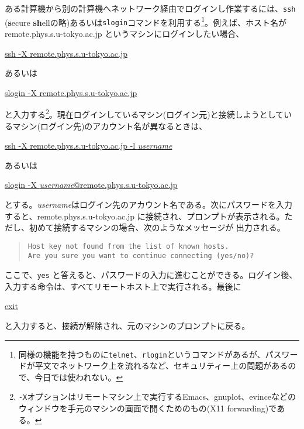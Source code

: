 ある計算機から別の計算機へネットワーク経由でログインし作業するには、{\tt ssh} ({\bf s}ecure {\bf sh}ellの略)あるいは{\tt slogin}コマンドを利用する\footnote{同様の機能を持つものに{\tt telnet}、{\tt rlogin}というコマンドがあるが、パスワードが平文でネットワーク上を流れるなど、セキュリティー上の問題があるので、今日では使われない。}。例えば、ホスト名が remote.phys.s.u-tokyo.ac.jp というマシンにログインしたい場合、
\begin{commandline2}
\prompt \underline{ssh -X remote.phys.s.u-tokyo.ac.jp}
\end{commandline2} \noindent
あるいは
\begin{commandline2}
\prompt \underline{slogin -X remote.phys.s.u-tokyo.ac.jp}
\end{commandline2} \noindent
と入力する\footnote{{\tt -X}オプションはリモートマシン上で実行するEmacs、gnuplot、evinceなどのウィンドウを手元のマシンの画面で開くためのもの(X11 forwarding)である。}。現在ログインしているマシン(ログイン元)と接続しようとしているマシン(ログイン先)のアカウント名が異なるときは、
\begin{commandline2}
\prompt \underline{ssh -X remote.phys.s.u-tokyo.ac.jp -l {\it username}}
\end{commandline2} \noindent
あるいは
\begin{commandline2}
\prompt \underline{slogin -X {\it username}@remote.phys.s.u-tokyo.ac.jp}
\end{commandline2} \noindent
とする。{\it username}はログイン先のアカウント名である。次にパスワードを入力すると、remote.phys.s.u-tokyo.ac.jp に接続され、プロンプトが表示される。ただし、初めて接続するマシンの場合、次のようなメッセージが
出力される。
\begin{quote}
\begin{verbatim}
Host key not found from the list of known hosts.
Are you sure you want to continue connecting (yes/no)?
\end{verbatim}
\end{quote}
ここで、{\tt yes} と答えると、パスワードの入力に進むことができる。ログイン後、入力する命令は、すべてリモートホスト上で実行される。最後に 
\begin{commandline2}
\prompt \underline{exit}
\end{commandline2} \noindent
と入力すると、接続が解除され、元のマシンのプロンプトに戻る。

